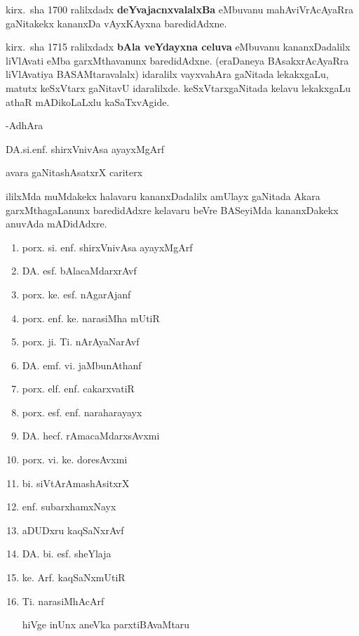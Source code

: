 kirx.~sha {\rm 1700} ralilxdadx \textbf{deYvajacnxvalalxBa} eMbuvanu mahAviVrAcAyaRra gaNitakekx kananxDa vAyxKAyxna baredidAdxne.

kirx.~sha {\rm 1715} ralilxdadx \textbf{bAla veYdayxna celuva} eMbuvanu kananxDadalilx liVlAvati eMba garxMthavanunx baredidAdxne. (eraDaneya BAsakxrAcAyaRra liVlAvatiya BASAMtaravalalx) idaralilx vayxvahAra gaNitada lekakxgaLu, matutx keSxVtarx gaNitavU idaralilxde. keSxVtarxgaNitada kelavu lekakxgaLu athaR mADikoLaLxlu kaSaTxvAgide.

\medskip
\hfill{-AdhAra}\hspace{1.8cm}

\hfill{DA.si.enf. shirxVnivAsa ayayxMgArf}

\hfill{avara gaNitashAsatxrX cariterx}\hspace{1cm}

ililxMda muMdakekx halavaru kananxDadalilx amUlayx gaNitada Akara garxMthagaLanunx baredidAdxre kelavaru beVre BASeyiMda kananxDakekx anuvAda mADidAdxre.

\begin{enumerate}[\rm 1)]
\item porx. si. enf. shirxVnivAsa ayayxMgArf

\item DA. esf. bAlacaMdarxrAvf

\item porx. ke. esf. nAgarAjanf

\item porx. enf. ke. narasiMha mUtiR

\item porx. ji. Ti. nArAyaNarAvf

\item DA. emf. vi. jaMbunAthanf

\item porx. elf. enf. cakarxvatiR

\item porx. esf. enf. naraharayayx

\item DA. hecf. rAmacaMdarxsAvxmi

\item porx. vi. ke. doresAvxmi

\item bi. siVtArAmashAsitxrX

\item enf. subarxhamxNayx

\item aDUDxru kaqSaNxrAvf

\item DA. bi. esf. sheYlaja

\item ke. Arf. kaqSaNxmUtiR

\item Ti. narasiMhAcArf

hiVge inUnx aneVka parxtiBAvaMtaru
\end{enumerate}

